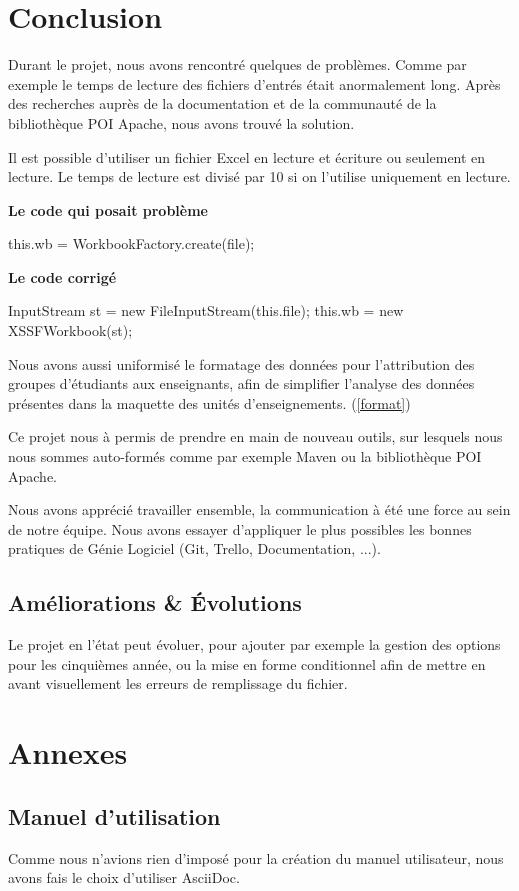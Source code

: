 \documentclass{polytech/polytech}
\begin{document}
	\chapter{Conclusion}

	Durant le projet, nous avons rencontré quelques de problèmes.
	Comme par exemple le temps de lecture des fichiers d'entrés était anormalement long.
	Après des recherches auprès de la documentation et de la communauté de la bibliothèque POI Apache, nous avons trouvé la solution.

	Il est possible d'utiliser un fichier Excel en lecture et écriture ou seulement en lecture.
	Le temps de lecture est divisé par 10 si on l'utilise uniquement en lecture.

	\textbf{Le code qui posait problème}
	\begin{latexsource}
	this.wb = WorkbookFactory.create(file);
	\end{latexsource}

	\textbf{Le code corrigé}
	\begin{latexsource}
	InputStream st = new FileInputStream(this.file);
	this.wb = new XSSFWorkbook(st);
	\end{latexsource}

	Nous avons aussi uniformisé le formatage des données pour l'attribution des groupes d'étudiants aux enseignants, afin de simplifier l'analyse des données présentes dans la maquette des unités d'enseignements. (\ref{format})

	Ce projet nous à permis de prendre en main de nouveau outils, sur lesquels nous nous sommes auto-formés comme par exemple Maven ou la bibliothèque POI Apache.

	Nous avons apprécié travailler ensemble, la communication à été une force au sein de notre équipe.
	Nous avons essayer d'appliquer le plus possibles les bonnes pratiques de Génie Logiciel (Git, Trello, Documentation, ...).

	\section{Améliorations \& Évolutions}

	Le projet en l'état peut évoluer, pour ajouter par exemple la gestion des options pour les cinquièmes année, ou la mise en forme conditionnel afin de mettre en avant visuellement les erreurs de remplissage du fichier.




	\chapter{Annexes}

	\section{Manuel d'utilisation}
	Comme nous n'avions rien d'imposé pour la création du manuel utilisateur, nous avons fais le choix d'utiliser AsciiDoc.

	
\end{document}
